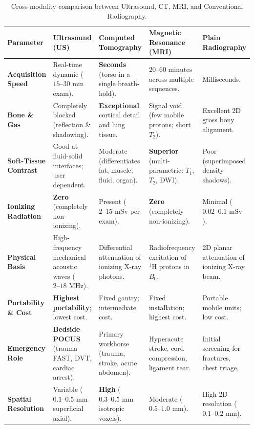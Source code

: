 \documentclass[11pt,a4paper]{article}
\begin{document}
\begin{table}[htbp]
\centering
\small
\setlength{\tabcolsep}{3pt}
\renewcommand{\arraystretch}{1.25}
\begin{tabular}{p{2.2cm}p{3.2cm}p{3.2cm}p{3.0cm}p{2.8cm}}
\toprule
\textbf{Parameter} & \textbf{Ultrasound (US)} & \textbf{Computed Tomography} & \textbf{Magnetic Resonance (MRI)} & \textbf{Plain Radiography} \\
\midrule
\textbf{Acquisition Speed} & Real-time dynamic ($15\text{--}30\text{ min}$ exam). & \textbf{Seconds} (torso in a single breath-hold). & $20\text{--}60\text{ minutes}$ across multiple sequences. & Milliseconds. \\
\textbf{Bone \& Gas} & Completely blocked (reflection \& shadowing). & \textbf{Exceptional} cortical detail and lung tissue. & Signal void (few mobile protons; short $T_2$). & Excellent 2D gross bony alignment. \\
\textbf{Soft-Tissue Contrast} & Good at fluid-solid interfaces; user dependent. & Moderate (differentiates fat, muscle, fluid, organ). & \textbf{Superior} (multi-parametric: $T_1$, $T_2$, DWI). & Poor (superimposed density shadows). \\
\textbf{Ionizing Radiation} & \textbf{Zero} (completely non-ionizing). & Present ($2\text{--}15\text{ mSv}$ per exam). & \textbf{Zero} (completely non-ionizing). & Minimal ($0.02\text{--}0.1\text{ mSv}$). \\
\textbf{Physical Basis} & High-frequency mechanical acoustic waves ($2\text{--}18\text{ MHz}$). & Differential attenuation of ionizing X-ray photons. & Radiofrequency excitation of $^1\text{H}$ protons in $B_0$. & 2D planar attenuation of ionizing X-ray beam. \\
\textbf{Portability \& Cost} & \textbf{Highest portability}; lowest cost. & Fixed gantry; intermediate cost. & Fixed installation; highest cost. & Portable mobile units; low cost. \\
\textbf{Emergency Role} & \textbf{Bedside POCUS} (trauma FAST, DVT, cardiac arrest). & Primary workhorse (trauma, stroke, acute abdomen). & Hyperacute stroke, cord compression, ligament tear. & Initial screening for fractures, chest triage. \\
\textbf{Spatial Resolution} & Variable ($0.1\text{--}0.5\text{ mm}$ superficial axial). & \textbf{High} ($0.3\text{--}0.5\text{ mm}$ isotropic voxels). & Moderate ($0.5\text{--}1.0\text{ mm}$). & High 2D resolution ($0.1\text{--}0.2\text{ mm}$). \\
\bottomrule
\end{tabular}
\caption{Cross-modality comparison between Ultrasound, CT, MRI, and Conventional Radiography.}
\label{tab:modality_comparison}
\end{table}
\end{document}
